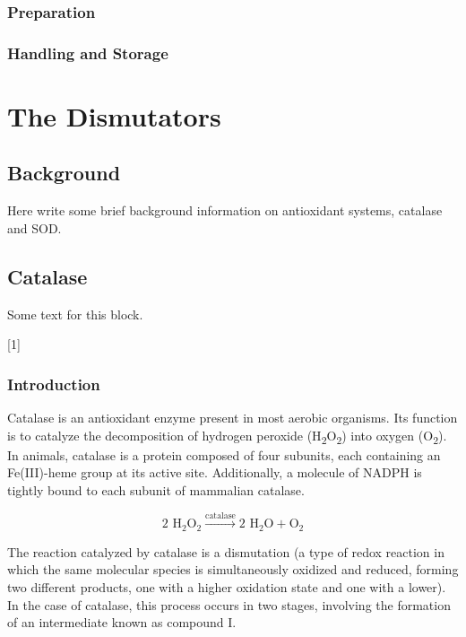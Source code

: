 \documentclass[
  9pt,
  american,
  a5paper,
  extrafontsizes,onecolumn,openright
  ]{memoir}
\newenvironment{Summary}
  {\begin{bclogo}[logo=\bctrombone, noborder=true, couleur=lightgray!50]{}\parindent0pt}
  {\end{bclogo}}
\newcommand{\toc}[1]{%
  \startcontents[chapters]%
  \printcontents[chapters]{}{1}[#1]{}%
  ~\newline%
}
\begin{document}
\section{Preparation}\label{preparation}

\section{Handling and Storage}\label{handling-and-storage}

\part{The Dismutators}\label{part-the-dismutators}

\chapter{Background}\label{background}

Here write some brief background information on antioxidant systems, catalase and SOD.

\chapter{Catalase}\label{catalase}

\begin{Summary}
Some text for this block.

\end{Summary}

\toc{1}

\newpage

\section{Introduction}\label{cat_intro}

Catalase is an antioxidant enzyme present in most aerobic organisms. Its function is to catalyze the decomposition of hydrogen peroxide (H\textsubscript{2}O\textsubscript{2}) into oxygen (O\textsubscript{2}). In animals, catalase is a protein composed of four subunits, each containing an Fe(III)-heme group at its active site. Additionally, a molecule of NADPH is tightly bound to each subunit of mammalian catalase.

\[
\text{2 H}_2\text{O}_2 \overset{\text{catalase}}{\rightarrow} \text{2 H}_2\text{O} + \text{O}_2
\]

The reaction catalyzed by catalase is a dismutation (a type of redox reaction in which the same molecular species is simultaneously oxidized and reduced, forming two different products, one with a higher oxidation state and one with a lower). In the case of catalase, this process occurs in two stages, involving the formation of an intermediate known as compound I.
\end{document}
